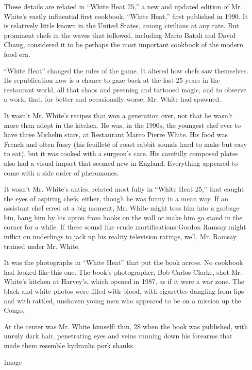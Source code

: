 These details are related in ``White Heat 25,'' a new and updated
edition of Mr. White's vastly influential first cookbook, ``White
Heat,'' first published in 1990. It is relatively little known in the
United States, among civilians at any rate. But prominent chefs in the
waves that followed, including Mario Batali and David Chang, considered
it to be perhaps the most important cookbook of the modern food era.

``White Heat'' changed the rules of the game. It altered how chefs saw
themselves. Its republication now is a chance to gaze back at the last
25 years in the restaurant world, all that chaos and preening and
tattooed magic, and to observe a world that, for better and occasionally
worse, Mr. White had spawned.

It wasn't Mr. White's recipes that won a generation over, not that he
wasn't more than adept in the kitchen. He was, in the 1990s, the
youngest chef ever to have three Michelin stars, at Restaurant Marco
Pierre White. His food was French and often fussy (his feuilleté of
roast rabbit sounds hard to make but easy to eat), but it was cooked
with a surgeon's care. His carefully composed plates also had a visual
impact that seemed new in England. Everything appeared to come with a
side order of pheromones.

It wasn't Mr. White's antics, related most fully in ``White Heat 25,''
that caught the eyes of aspiring chefs, either, though he was funny in a
mean way. If an assistant chef erred at a big moment, Mr. White might
toss him into a garbage bin, hang him by his apron from hooks on the
wall or make him go stand in the corner for a while. If these sound like
crude mortifications Gordon Ramsay might inflict on underlings to jack
up his reality television ratings, well, Mr. Ramsay trained under Mr.
White.

It was the photographs in ``White Heat'' that put the book across. No
cookbook had looked like this one. The book's photographer, Bob Carlos
Clarke, shot Mr. White's kitchen at Harvey's, which opened in 1987, as
if it were a war zone. The black-and-white photos were filled with
blood, with cigarettes dangling from lips and with rattled, unshaven
young men who appeared to be on a mission up the Congo.

At the center was Mr. White himself: thin, 28 when the book was
published, with unruly dark hair, penetrating eyes and veins running
down his forearms that made them resemble hydraulic pork shanks.

Image


